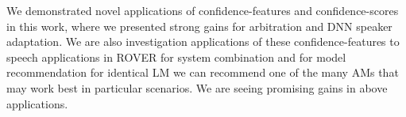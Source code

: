 We demonstrated novel applications of confidence-features and confidence-scores in this work, where we presented strong gains for arbitration and DNN speaker adaptation. We are also investigation applications of these confidence-features to speech applications in ROVER for system combination and for model recommendation for identical LM we can recommend one of the many AMs that may work best in particular scenarios. We are seeing promising gains in above applications.
